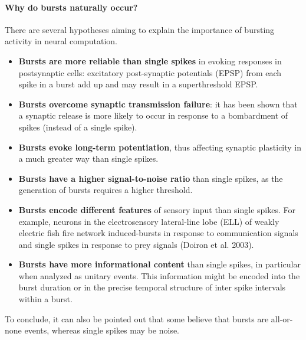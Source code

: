 \paragraph{Why do bursts naturally occur?}
There are several hypotheses aiming to explain the importance of bursting activity in
neural computation.
\begin{itemize}
    \item \textbf{Bursts are more reliable than single spikes} in evoking responses in
          postsynaptic cells: excitatory post-synaptic potentials (EPSP) from each spike in a burst add up and may result in a superthreshold EPSP.
    \item \textbf{Bursts overcome synaptic transmission failure}: it has been shown
          that a synaptic release is more likely to occur in response to a bombardment
          of spikes (instead of a single spike).
    \item \textbf{Bursts evoke long-term potentiation}, thus affecting synaptic
          plasticity in a much greater way than single spikes.
    \item \textbf{Bursts have a higher signal-to-noise ratio} than single spikes, as
          the generation of bursts requires a higher threshold.
    \item \textbf{Bursts encode different features} of sensory input than single
          spikes. For example, neurons in the electrosensory lateral-line lobe (ELL) of weakly electric fish fire network induced-bursts in response to communication signals and single spikes in response to prey signals (Doiron et al. 2003).
    \item \textbf{Bursts have more informational content} than single spikes, in
          particular when analyzed as unitary events. This information might be encoded
          into the burst duration or in the precise temporal structure of inter spike
          intervals within a burst.
\end{itemize}
To conclude, it can also be pointed out that some believe that bursts are all-or-none events, whereas single spikes may be noise.
